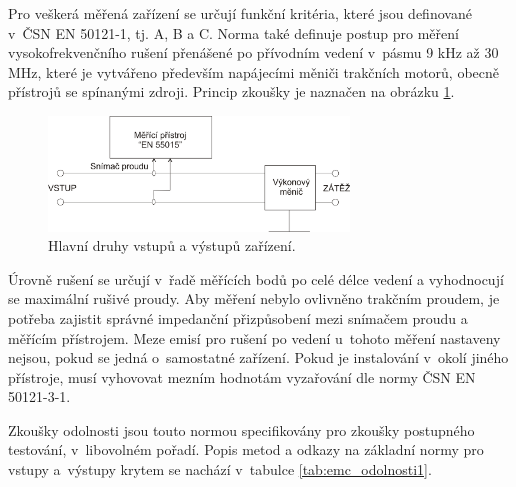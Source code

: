 Pro veškerá měřená zařízení se určují funkční kritéria, které jsou definované v~ČSN EN 50121-1, tj. A, B a C. Norma také definuje postup pro měření vysokofrekvenčního rušení přenášené po přívodním vedení v~pásmu 9 kHz až 30 MHz, které je vytvářeno především napájecími měniči trakčních motorů, obecně přístrojů se spínanými zdroji. Princip zkoušky je naznačen na obrázku \ref{obr:emc_vf}. 

\begin{figure}[!h]
	\centering
	\includegraphics[width=8cm]{emc_vf.png}
	\caption{Hlavní druhy vstupů a výstupů zařízení.}
	\label{obr:emc_vf}
\end{figure}

Úrovně rušení se určují v~řadě měřících bodů po celé délce vedení a vyhodnocují se maximální rušivé proudy. Aby měření nebylo ovlivněno trakčním proudem, je potřeba zajistit správné impedanční přizpůsobení mezi snímačem proudu a měřícím přístrojem. Meze emisí pro rušení po vedení u~tohoto měření nastaveny nejsou, pokud se jedná o~samostatné zařízení. Pokud je instalování v~okolí jiného přístroje, musí vyhovovat mezním hodnotám vyzařování dle normy ČSN EN 50121-3-1.

Zkoušky odolnosti jsou touto normou specifikovány pro zkoušky postupného testování, v~libovolném pořadí. Popis metod a odkazy na základní normy pro vstupy a~výstupy krytem se nachází v~tabulce \ref{tab:emc_odolnosti1}.

